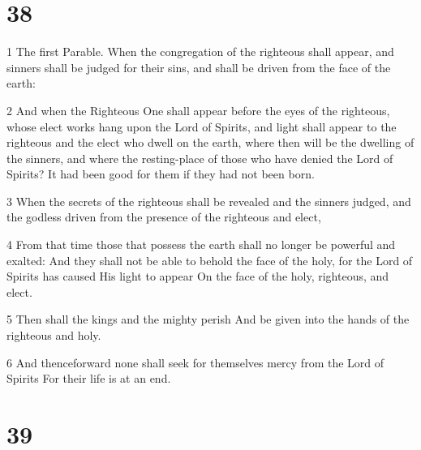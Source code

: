 \chapter{38}
\par 1 The first Parable. When the congregation of the righteous shall appear, and sinners shall be judged for their sins, and shall be driven from the face of the earth:
\par 2 And when the Righteous One shall appear before the eyes of the righteous, whose elect works hang upon the Lord of Spirits, and light shall appear to the righteous and the elect who dwell on the earth, where then will be the dwelling of the sinners, and where the resting-place of those who have denied the Lord of Spirits? It had been good for them if they had not been born.
\par 3 When the secrets of the righteous shall be revealed and the sinners judged, and the godless driven from the presence of the righteous and elect,
\par 4 From that time those that possess the earth shall no longer be powerful and exalted: And they shall not be able to behold the face of the holy, for the Lord of Spirits has caused His light to appear On the face of the holy, righteous, and elect.
\par 5 Then shall the kings and the mighty perish And be given into the hands of the righteous and holy.
\par 6 And thenceforward none shall seek for themselves mercy from the Lord of Spirits For their life is at an end.

\chapter{39}

